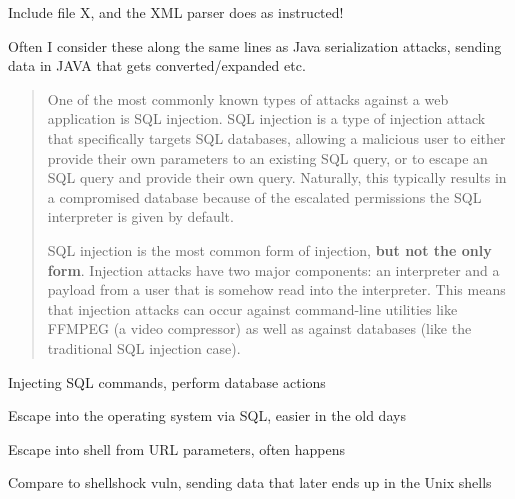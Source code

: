 \documentclass[Screen16to9,17pt]{foils}
\begin{document}
\begin{list2}
\item Include file X, and the XML parser does as instructed!
  \item Often I consider these along the same lines as Java serialization attacks, sending data in JAVA that gets converted/expanded etc.
\end{list2}


\begin{quote}
One of the most commonly known types of attacks against a web application is SQL injection. SQL injection is a type of injection attack that specifically targets SQL databases, allowing a malicious user to either provide their own parameters to an existing SQL query, or to escape an SQL query and provide their own query. Naturally, this typically results in a compromised database because of the escalated permissions the SQL interpreter is given by default.

SQL injection is the most common form of injection, {\bf but not the only form}. Injection attacks have two major components: an interpreter and a payload from a user that is somehow read into the interpreter. This means that injection attacks can occur against command-line utilities like FFMPEG (a video compressor) as well as against databases (like the traditional SQL injection case).
\end{quote}

\begin{list2}
\item Injecting SQL commands, perform database actions
\item Escape into the operating system via SQL, easier in the old days
\item Escape into shell from URL parameters, often happens
\item Compare to shellshock vuln, sending data that later ends up in the Unix shells
\end{list2}



\end{document}
